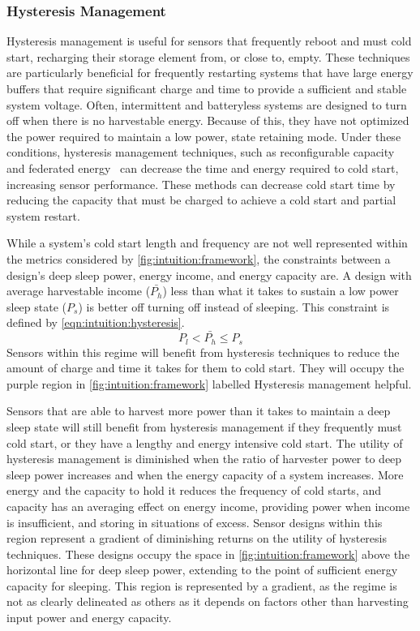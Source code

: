 \subsubsection{Hysteresis Management}
Hysteresis management is useful for sensors that frequently reboot and must cold start, recharging their storage element from, or close to, empty. 
These techniques are particularly beneficial for frequently restarting systems that have large energy buffers that require significant charge and time to provide a sufficient and stable system voltage. 
Often, intermittent and batteryless systems are designed to turn off when there is no harvestable energy. Because of this, they have not optimized the power required to maintain a low power, state retaining mode. 
Under these conditions, hysteresis management techniques,
such as reconfigurable capacity~\cite{colinReconfigurable18} and federated energy~\cite{hesterFlicker17} can decrease the time and energy required to cold start, increasing sensor
performance.
These methods can decrease cold start time
by reducing the capacity that must be charged to achieve a cold start and partial system restart.

While a system's cold start length and frequency are not well represented within the metrics considered by \cref{fig:intuition:framework}, 
the constraints between a design's deep sleep power, energy income, and energy capacity are. 
A design with average harvestable income ($\bar{P_h}$) less than what it takes to sustain a low power sleep state ($P_s$) is better off turning off instead of sleeping. This constraint is defined by \cref{eqn:intuition:hysteresis}. 
\begin{equation}
    \label{eqn:intuition:hysteresis}
    P_l < \bar{P_h} \leq P_s
\end{equation}
Sensors within this regime will benefit from hysteresis techniques to reduce the amount of charge and time it takes for them to cold start. They will occupy the purple region in \cref{fig:intuition:framework} labelled \textsf{Hysteresis management helpful}. 

Sensors that are able to harvest more power than it takes to maintain a deep sleep state will still benefit from hysteresis management if they frequently must cold start, or they have a lengthy and energy intensive cold start.
The utility of hysteresis management is diminished
when the ratio of harvester power to deep sleep power increases and when the energy capacity of a system increases.
More energy and the capacity to hold it reduces the frequency of cold starts, and capacity has an averaging effect on energy income, providing power when income is insufficient, and storing in situations of excess. 
Sensor designs within this region represent a gradient of diminishing returns on the utility of hysteresis techniques.
These designs occupy the space in \cref{fig:intuition:framework} above the horizontal line for deep sleep power, extending to the point of sufficient energy capacity for sleeping.
This region is represented by a gradient, as the regime is not as clearly delineated as others as it depends on factors other than harvesting input power and energy capacity.


